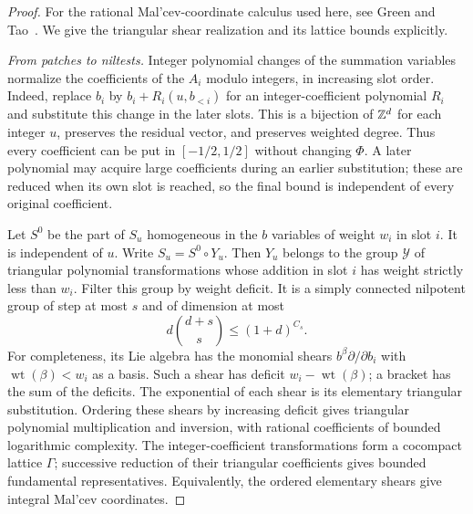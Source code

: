 \begin{proof}
For the rational Mal'cev-coordinate calculus used here, see
Green and Tao~\cite[Appendix~A]{GreenTaoOrbits2012}. We give the
triangular shear realization and its lattice bounds explicitly.

\emph{From patches to niltests.}
Integer polynomial changes of the summation variables normalize the
coefficients of the $A_i$ modulo integers, in increasing slot order.
Indeed, replace $b_i$ by $b_i+R_i(u,b_{<i})$ for an integer-coefficient
polynomial $R_i$ and substitute this change in the later slots.  This
is a bijection of $\mathbb Z^d$ for each integer $u$, preserves the residual
vector, and preserves weighted degree.  Thus every coefficient can be
put in $[-1/2,1/2]$ without changing $\Phi$.  A later polynomial may
acquire large coefficients during an earlier substitution; these are
reduced when its own slot is reached, so the final bound is independent
of every original coefficient.

Let $S^0$ be the part of $S_u$ homogeneous in the $b$ variables of
weight $w_i$ in slot $i$.  It is independent of $u$.  Write
$S_u=S^0\circ Y_u$.  Then $Y_u$ belongs to the group $\mathcal Y$ of
triangular polynomial transformations whose addition in slot $i$ has
weight strictly less than $w_i$.  Filter this group by weight deficit.
It is a simply connected nilpotent group of step at most $s$ and
of dimension at most
\[
 d\binom{d+s}{s}\leq(1+d)^{C_s}.
\]
For completeness, its Lie algebra has the monomial shears
$b^\beta\partial/\partial b_i$ with $\operatorname{wt}(\beta)<w_i$
as a basis.  Such a shear has deficit
$w_i-\operatorname{wt}(\beta)$; a bracket has the sum of the deficits.
The exponential of each shear is its elementary triangular substitution.
Ordering these shears by increasing deficit gives triangular polynomial
multiplication and inversion, with rational coefficients of bounded
logarithmic complexity.  The integer-coefficient transformations form
a cocompact lattice $\Gamma$; successive reduction of their triangular
coefficients gives bounded fundamental representatives.  Equivalently,
the ordered elementary shears give integral Mal'cev coordinates.


\end{proof}
